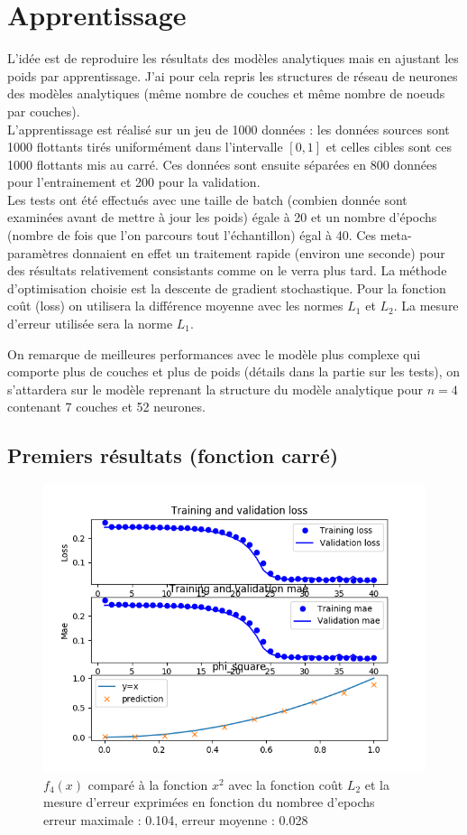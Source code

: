\documentclass[a4paper,11pt,twoside]{report}
\begin{document}
	\section{Apprentissage}
	L'idée est de reproduire les résultats des modèles analytiques mais en ajustant les poids par apprentissage.
	J'ai pour cela repris les structures de réseau de neurones des modèles analytiques (même nombre de couches et même nombre de noeuds par couches).\\L'apprentissage est réalisé sur un jeu de 1000 données : les données sources sont 1000 flottants tirés uniformément dans l'intervalle $[0,1]$ et celles cibles sont ces 1000 flottants mis au carré. Ces données sont ensuite séparées en 800 données pour l'entrainement et 200 pour la validation. \\Les tests ont été effectués avec une taille de batch (combien donnée sont examinées avant de mettre à jour les poids) égale à 20 et un nombre d'épochs (nombre de fois que l'on parcours tout l'échantillon) égal à 40. Ces meta-paramètres donnaient en effet un traitement rapide (environ une seconde) pour des résultats relativement consistants comme on le verra plus tard. La méthode d'optimisation choisie est la descente de gradient stochastique. Pour la fonction coût (loss) on utilisera la différence moyenne avec les normes $L_1$ et $L_2$. La mesure d'erreur utilisée sera la norme $L_1$.
	
	On remarque de meilleures performances avec le modèle plus complexe qui comporte plus de couches et plus de poids (détails dans la partie sur les tests), on s'attardera sur le modèle reprenant la structure du modèle analytique pour $n=4$ contenant 7 couches et 52 neurones.
	
	\subsection{Premiers résultats (fonction carré)}
	
	\begin{figure}[H]
		\begin{center}
			\includegraphics[width=0.7\linewidth]{Figure_1.png}
			\caption{$f_4(x)$ comparé à la fonction $x^2$  avec la fonction coût $L_2$ et la mesure d'erreur exprimées en fonction du nombree d'epochs\\erreur maximale : 0.104, erreur moyenne : 0.028}
		\end{center}
	\end{figure}
	
\end{document}
